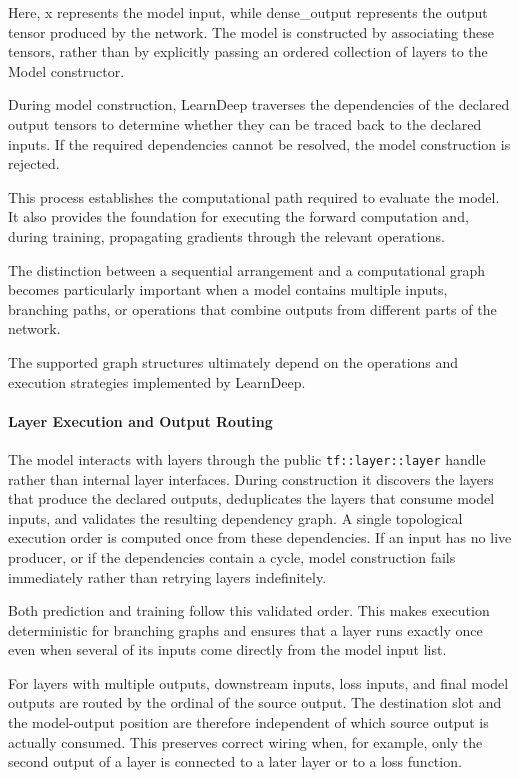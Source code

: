 Here, x represents the model input, while dense\_output
represents the output tensor produced by the network.
The model is constructed by associating these tensors,
rather than by explicitly passing an ordered collection
of layers to the Model constructor.

During model construction, LearnDeep traverses the
dependencies of the declared output tensors to determine
whether they can be traced back to the declared inputs.
If the required dependencies cannot be resolved, the
model construction is rejected.

This process establishes the computational path required
to evaluate the model. It also provides the foundation
for executing the forward computation and, during training,
propagating gradients through the relevant operations.

The distinction between a sequential arrangement and
a computational graph becomes particularly important
when a model contains multiple inputs, branching paths,
or operations that combine outputs from different parts
of the network.

The supported graph structures ultimately depend on the
operations and execution strategies implemented by
LearnDeep.

\paragraph{Layer Execution and Output Routing}

The model interacts with layers through the public
\texttt{tf::layer::layer} handle rather than internal layer
interfaces. During construction it discovers the layers that
produce the declared outputs, deduplicates the layers that
consume model inputs, and validates the resulting dependency
graph. A single topological execution order is computed once
from these dependencies. If an input has no live producer, or
if the dependencies contain a cycle, model construction fails
immediately rather than retrying layers indefinitely.

Both prediction and training follow this validated order.
This makes execution deterministic for branching graphs and
ensures that a layer runs exactly once even when several of
its inputs come directly from the model input list.

For layers with multiple outputs, downstream inputs, loss
inputs, and final model outputs are routed by the ordinal of
the source output. The destination slot and the model-output
position are therefore independent of which source output is
actually consumed. This preserves correct wiring when, for
example, only the second output of a layer is connected to a
later layer or to a loss function.

